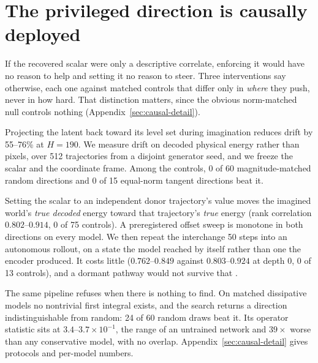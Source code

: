 \section{The privileged direction is causally deployed}
\label{sec:causality}

If the recovered scalar were only a descriptive correlate, enforcing it would have no reason to help
and setting it no reason to steer. Three interventions say otherwise, each one against matched
controls that differ only in \emph{where} they push, never in how hard. That distinction matters,
since the obvious norm-matched null controls nothing (Appendix~\ref{sec:causal-detail}).

Projecting the latent back toward its level set during imagination reduces drift by 55--76\% at
$H=190$. We measure drift on decoded physical energy rather than pixels, over 512 trajectories from
a disjoint generator seed, and we freeze the scalar and the coordinate frame. Among the controls,
0 of 60 magnitude-matched random directions and 0 of 15 equal-norm tangent directions beat it.

Setting the scalar to an independent donor trajectory's value moves the imagined world's \emph{true
decoded} energy toward that trajectory's \emph{true} energy (rank correlation $0.802$--$0.914$,
0 of 75 controls). A preregistered offset sweep is monotone in both directions on every model. We
then repeat the interchange 50 steps into an autonomous rollout, on a state the model reached by
itself rather than one the encoder produced. It costs little ($0.762$--$0.849$ against
$0.803$--$0.924$ at depth 0, 0 of 13 controls), and a dormant pathway would not survive that
\citep{makelov2024illusion}.

The same pipeline refuses when there is nothing to find. On matched dissipative models no nontrivial
first integral exists, and the search returns a direction indistinguishable from random: 24 of 60
random draws beat it. Its operator statistic sits at $3.4$--$3.7\times10^{-1}$, the range of an
untrained network and $39\times$ worse than any conservative model, with no overlap.
Appendix~\ref{sec:causal-detail} gives protocols and per-model numbers.
